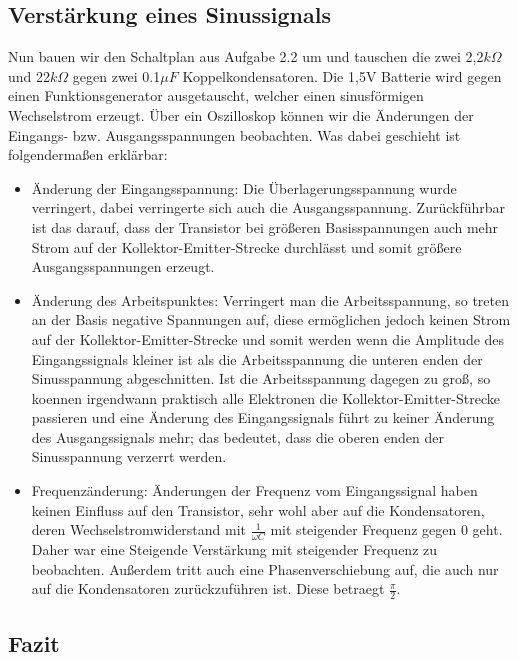 \subsection{Verstärkung eines Sinussignals}

Nun bauen wir den Schaltplan aus Aufgabe 2.2 um und tauschen die zwei 2,2\(k\Omega\) und 22\(k\Omega\) gegen zwei 0.1\(\mu F\) Koppelkondensatoren. Die 1,5V Batterie wird gegen einen Funktionsgenerator ausgetauscht, welcher einen sinusförmigen Wechselstrom erzeugt. Über ein Oszilloskop können wir die Änderungen der Eingangs- bzw. Ausgangsspannungen beobachten. Was dabei geschieht ist folgendermaßen erklärbar:

\begin{itemize}
\item Änderung der Eingangsspannung: Die Überlagerungsspannung wurde verringert, dabei verringerte sich auch die Ausgangsspannung. Zurückführbar ist das darauf, dass der Transistor bei größeren Basisspannungen auch mehr Strom auf der Kollektor-Emitter-Strecke durchlässt und somit größere Ausgangsspannungen erzeugt.
\item Änderung des Arbeitspunktes: Verringert man die Arbeitsspannung, so treten an der Basis negative Spannungen auf, diese ermöglichen jedoch keinen Strom auf der Kollektor-Emitter-Strecke und somit werden wenn die Amplitude des Eingangssignals kleiner ist als die Arbeitsspannung die unteren enden der Sinusspannung abgeschnitten. Ist die Arbeitsspannung dagegen zu groß, so koennen irgendwann praktisch alle Elektronen die Kollektor-Emitter-Strecke passieren und eine Änderung des Eingangssignals führt zu keiner Änderung des Ausgangssignals mehr; das bedeutet, dass die oberen enden der Sinusspannung verzerrt werden.
\item Frequenzänderung: Änderungen der Frequenz vom Eingangssignal haben keinen Einfluss auf den Transistor, sehr wohl aber auf die Kondensatoren, deren Wechselstromwiderstand mit \(\frac{1}{\omega C}\) mit steigender Frequenz gegen 0 geht. Daher war eine Steigende Verstärkung mit steigender Frequenz zu beobachten. Außerdem tritt auch eine Phasenverschiebung auf, die auch nur auf die Kondensatoren zurückzuführen ist. Diese betraegt \(\frac{\pi}{2}\). 

\end{itemize}

\subsection{Fazit}

